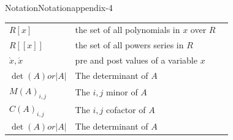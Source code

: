 \documentclass[twoside,10pt,]{book}
\numberwithin{equation}{section}
\begin{document}
\begin{appendixptx}{Notation}{}{Notation}{}{}{appendix-4}
\begin{longtable}[l]{lp{}r}
\(R[x]\)&the set of all polynomials in \(x\) over \(R\)&\pageref{notation-109}\\
\(R[[x]]\)&the set of all powers series in \(R\)&\pageref{notation-110}\\
\(\grave x,  \acute x\)&pre and post values of a variable \(x\)&\pageref{notation-111}\\
\(\det(A) or \lvert A \rvert\)&The determinant of \(A\)&\pageref{notation-112}\\
\(M(A)_{i,j}\)&The \(i, j\) minor of \(A\)&\pageref{notation-113}\\
\(C(A)_{i,j}\)&The \(i, j\) cofactor of \(A\)&\pageref{notation-114}\\
\(\det(A) or \lvert A \rvert\)&The determinant of \(A\)&\pageref{notation-115}\\
\end{longtable}
\end{appendixptx}
%
\backmatter
%
%
%
\typeout{************************************************}
\typeout{************************************************}
%
\end{document}
